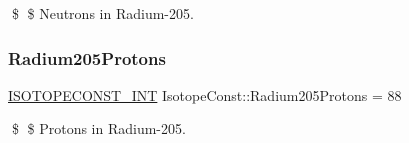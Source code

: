 \$ \$ Neutrons in Radium-\/205. \mbox{\label{group___isotope_const-_radium-_ra205_ga0780cc7c171ee533c2534b24b6b7e8b1}} 
\subsubsection{\texorpdfstring{Radium205\+Protons}{Radium205Protons}}
{\footnotesize\ttfamily \mbox{\hyperlink{group___isotope_const-_macros_ga5f18360b3e99483a35c32d789e62621c}{I\+S\+O\+T\+O\+P\+E\+C\+O\+N\+S\+T\+\_\+\+I\+NT}} Isotope\+Const\+::\+Radium205\+Protons = 88}

\$ \$ Protons in Radium-\/205. 